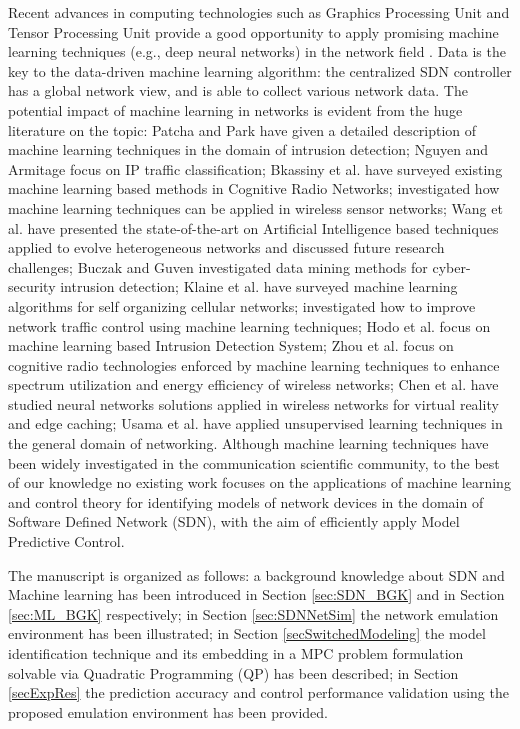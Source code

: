 Recent advances in computing technologies such as Graphics Processing Unit and Tensor Processing Unit provide a good opportunity to apply promising machine learning techniques (e.g., deep neural networks) in the network field \cite{Wang2018, Usama2017}. Data is the key to the data-driven machine learning algorithm: the centralized SDN controller has a global network view, and is able to collect various network data. The potential impact of machine learning in networks is evident from the huge literature on the topic: Patcha and Park \cite{Patcha2007} have given a detailed description of machine learning techniques in the domain of intrusion detection; Nguyen and Armitage \cite{Nguyen2008} focus on IP traffic classification; Bkassiny et al. \cite{Bkassiny2013} have surveyed existing machine learning based methods in Cognitive Radio Networks; \cite{Alsheikh2014} investigated how machine learning techniques can be applied in wireless sensor networks; Wang et al. \cite{Wang2015} have presented the state-of-the-art on Artificial Intelligence based techniques applied to evolve heterogeneous networks and discussed future research challenges; Buczak and Guven \cite{Buczak2016} investigated data mining methods for cyber-security intrusion detection; Klaine et al. \cite{Klaine2017} have surveyed machine learning algorithms for self organizing cellular networks; \cite{Fadlullah2017} investigated how to improve network traffic control using machine learning techniques; Hodo et al. \cite{Hodo2017} focus on machine learning based Intrusion Detection System; Zhou et al. \cite{Zhou2017} focus on cognitive radio technologies enforced by machine learning techniques to enhance spectrum utilization and energy efficiency of wireless networks; Chen et al. \cite{Chen2017} have studied neural networks solutions applied in wireless networks for virtual reality and edge caching; Usama et al. \cite{Usama2017} have applied unsupervised learning techniques in the general domain of networking. Although machine learning techniques have been widely investigated in the communication scientific community, to the best of our knowledge no existing work focuses on the applications of machine learning and control theory for identifying models of network devices in the domain of Software Defined Network (SDN), with the aim of efficiently apply Model Predictive Control.

The manuscript is organized as follows: a background knowledge about SDN and Machine learning has been introduced in Section \ref{sec:SDN_BGK} and in Section \ref{sec:ML_BGK} respectively; in Section \ref{sec:SDNNetSim} the network emulation environment has been illustrated; in Section \ref{secSwitchedModeling} the model identification technique and its embedding in a MPC problem formulation solvable via Quadratic Programming (QP) has been described; in Section \ref{secExpRes} the prediction accuracy and control performance validation using the proposed emulation environment has been provided.